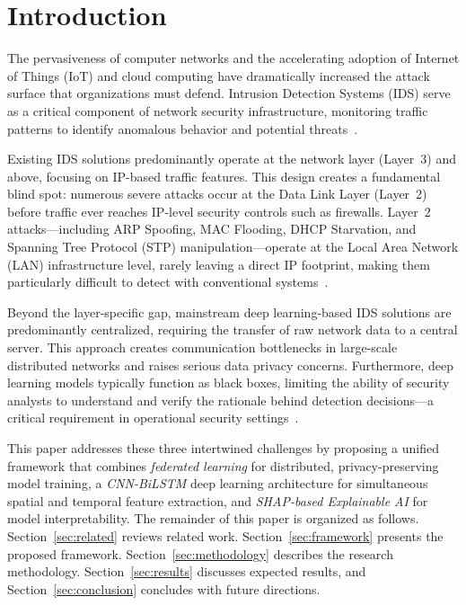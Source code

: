 \documentclass[conference]{IEEEtran}
\begin{document}
\section{Introduction}

The pervasiveness of computer networks and the accelerating adoption of Internet of
Things (IoT) and cloud computing have dramatically increased the attack surface that
organizations must defend. Intrusion Detection Systems (IDS) serve as a critical
component of network security infrastructure, monitoring traffic patterns to identify
anomalous behavior and potential threats~\cite{chinnasamy2025}.

Existing IDS solutions predominantly operate at the network layer (Layer~3) and above,
focusing on IP-based traffic features. This design creates a fundamental blind spot:
numerous severe attacks occur at the Data Link Layer (Layer~2) before traffic ever
reaches IP-level security controls such as firewalls. Layer~2 attacks---including ARP
Spoofing, MAC Flooding, DHCP Starvation, and Spanning Tree Protocol (STP)
manipulation---operate at the Local Area Network (LAN) infrastructure level, rarely
leaving a direct IP footprint, making them particularly difficult to detect with
conventional systems~\cite{kilincer2025,gombao2025}.

Beyond the layer-specific gap, mainstream deep learning-based IDS solutions are
predominantly centralized, requiring the transfer of raw network data to a central
server. This approach creates communication bottlenecks in large-scale distributed
networks and raises serious data privacy concerns. Furthermore, deep learning models
typically function as black boxes, limiting the ability of security analysts to
understand and verify the rationale behind detection decisions---a critical requirement
in operational security settings~\cite{belenguer2025}.

This paper addresses these three intertwined challenges by proposing a unified framework
that combines \textit{federated learning} for distributed, privacy-preserving model
training, a \textit{CNN-BiLSTM} deep learning architecture for simultaneous spatial and
temporal feature extraction, and \textit{SHAP-based Explainable AI} for model
interpretability. The remainder of this paper is organized as follows.
Section~\ref{sec:related} reviews related work. Section~\ref{sec:framework} presents
the proposed framework. Section~\ref{sec:methodology} describes the research
methodology. Section~\ref{sec:results} discusses expected results, and
Section~\ref{sec:conclusion} concludes with future directions.
\end{document}
